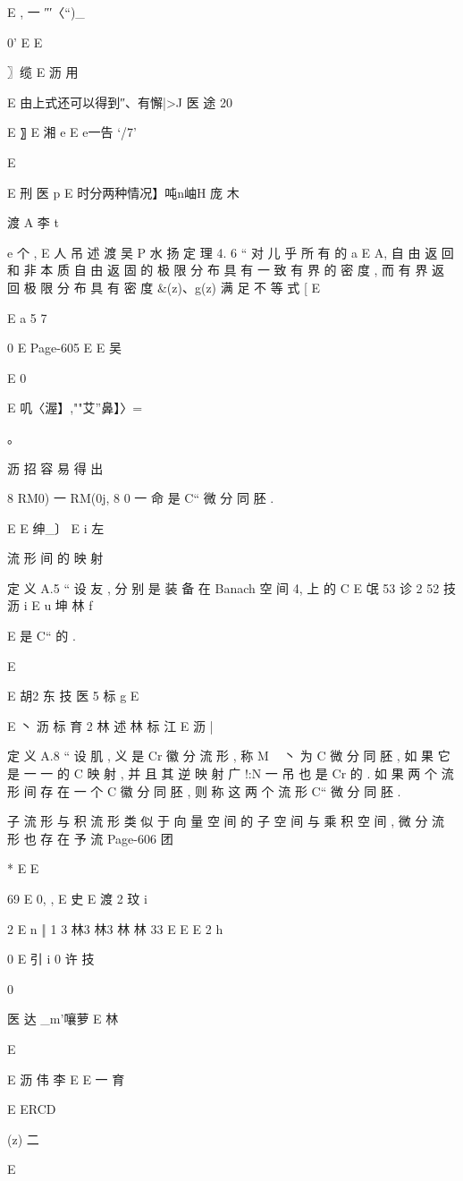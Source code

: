 E
, 一
″′〈“)_{0' E
E

〗缆 E 沥 用

E 由上式还可以得到″、有懈|>J 医 途
20

E 〗 E 湘 e E e一告 `/7'

E

E 刑 医 p
E 时分两种情况】吨n岫H 庞 木

渡 A 李 t

e 个 ,
E 人 吊 述 渡 吴 P 水 扬
定 理 4. 6 “ 对 儿 乎 所 有 的 a E A, 自 由 返 回 和 非 本 质 自 由 返 固
的 极 限 分 布 具 有 一 致 有 界 的 密 度 , 而 有 界 返 回 极 限 分 布 具 有 密 度
&(z)、g(z) 满 足 不 等 式
[ E

E a
5 7

0
E
Page-605
E E 吴

E
0

E 叽〈渥】,""艾”鼻】〉=

。

沥 招
容 易 得 出

8 RM0) 一 RM(0j, 8 0 一 命
是 C“ 微 分 同 胚 .

E E 绅_〕
E i 左

流 形 间 的 映 射

定 义 A.5 “ 设 友 , 分 别 是 装 备 在 Banach 空 间 4, 上 的 C
E
氓 53 诊 2 52 技 沥 i
E u 坤 林 f

E
是 C“ 的 .

E

E 胡2 东 技
医 5 标 g
E

E 丶 沥 标 育 2 林 述 林 标 江
E 沥 |

定 义 A.8 “ 设 肌 , 义 是 Cr 徽 分 流 形 , 称 M ~ 丶 为 C 微 分
同 胚 , 如 果 它 是 一 一 的 C 映 射 , 并 且 其 逆 映 射 广 !:N 一 吊 也 是 Cr
的 . 如 果 两 个 流 形 间 存 在 一 个 C 徽 分 同 胚 , 则 称 这 两 个 流 形 C“ 微
分 同 胚 .

子 流 形 与 积 流 形
类 似 于 向 量 空 间 的 子 空 间 与 乘 积 空 间 , 微 分 流 形 也 存 在 予 流
Page-606
团

* E
E

69 E 0,
, E 史
E 渡 2
玟
i

2 E n ‖
1
3 林3 林3 林 林 33
E E E 2 h

0
E 引 i 0 许 技

0

医 达
_m'嚷萝 E 林

E

E 沥 伟 李
E
E 一 育

E
ERCD

(z) 二

E

}
